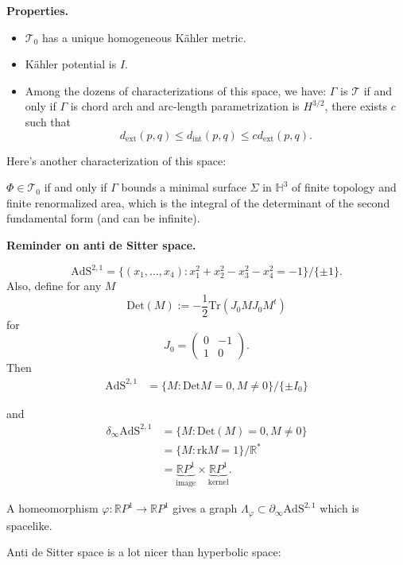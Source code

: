 \medskip\noindent
{\bf Properties.}

\begin{itemize}
\item $\mathcal{T}_0$ has a
unique homogeneous Kähler metric.
\item Kähler potential is $I$.
\item Among the dozens
of characterizations of this space,
we have:
$\Gamma$ is $\mathcal{T}$
if and only if $\Gamma$
is chord arch and arc-length
parametrization is $H^{3/2}$,
there exists $c$ such that
$$
d_{\text{ext}}(p,q)
\leq  d_{\text{int}}(p,q)
\leq cd_{\text{ext}}(p,q).
$$
\end{itemize}

\noindent
Here's another characterization 
of this space:

\begin{theorem}[Bishop]
\label{theorem-bishop-teichmmuller}
$\Phi \in \mathcal{T}_0$ if and only if
$\Gamma$ bounds a minimal surface
$\Sigma$ in $\mathbb{H}^3$
of finite topology and finite
renormalized area, which
is the integral of the determinant
of the second fundamental form
(and can be infinite).
\end{theorem}

\medskip\noindent
{\bf Reminder on anti de Sitter space.}

$$
\text{AdS}^{2,1}
=
\{(x_1,…,x_4)
: x_1^2+x_2^2-x_3^2-x_4^2=-1\}
/\{\pm  1\}.
$$
Also, define for any $M$
$$
\text{Det}(M):=
-\frac{1}{2}
\text{Tr}(J_0M J_0M^t)
$$
for
$$
J_0=
\begin{pmatrix}0&-1\\ 
1&0\end{pmatrix}.
$$
Then
$$
\begin{aligned}
\text{AdS}^{2,1}&=
\{M : \text{Det}M=0, M\neq 0\}
/\{\pm I_0\}
\end{aligned}
$$

\noindent
and
$$
\begin{aligned}
\delta_{\infty}\text{AdS}^{2,1}&=
\{M: \text{Det}(M)=0,M \neq 0\}\\
&=\{M:\text{rk}M=1\}/\mathbb{R}^*\\
&=\underbrace{\mathbb{R}P^1}_{\text{image}} 
\times \underbrace{\mathbb{R}P^1}
_{\text{kernel}}.
\end{aligned}
$$

\noindent
A homeomorphism 
$\varphi:\mathbb{R}P^1 \to \mathbb{R}P^1$
gives a graph $\Lambda_\varphi
\subset \partial_{\infty}\text{AdS}
^{2,1}$ which is spacelike.

Anti de Sitter space is a lot nicer
than hyperbolic space:

